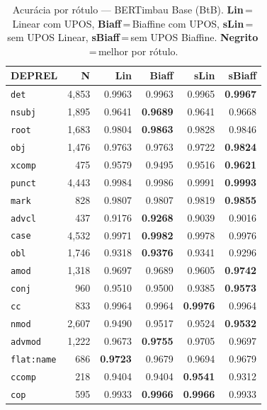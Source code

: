 \begin{table}[ht]
\centering\scriptsize
\setlength{\tabcolsep}{3pt}
\caption{Acurácia por rótulo --- BERTimbau Base (BtB). \textbf{Lin}\,=\,Linear com UPOS, \textbf{Biaff}\,=\,Biaffine com UPOS, \textbf{sLin}\,=\,sem UPOS Linear, \textbf{sBiaff}\,=\,sem UPOS Biaffine. \textbf{Negrito}\,=\,melhor por rótulo.}
\label{tab:acc-btb}
\begin{minipage}[t]{0.60\linewidth}
\centering
\begin{tabular}{l r  r r r r}
\toprule
\textbf{DEPREL} & \textbf{N} & \textbf{Lin} & \textbf{Biaff} & \textbf{sLin} & \textbf{sBiaff} \\
\midrule
\texttt{det} & 4,853 & 0.9963 & 0.9963 & 0.9965 & \textbf{0.9967} \\
\texttt{nsubj} & 1,895 & 0.9641 & \textbf{0.9689} & 0.9641 & 0.9668 \\
\texttt{root} & 1,683 & 0.9804 & \textbf{0.9863} & 0.9828 & 0.9846 \\
\texttt{obj} & 1,476 & 0.9763 & 0.9763 & 0.9722 & \textbf{0.9824} \\
\texttt{xcomp} & 475 & 0.9579 & 0.9495 & 0.9516 & \textbf{0.9621} \\
\texttt{punct} & 4,443 & 0.9984 & 0.9986 & 0.9991 & \textbf{0.9993} \\
\texttt{mark} & 828 & 0.9807 & 0.9807 & 0.9819 & \textbf{0.9855} \\
\texttt{advcl} & 437 & 0.9176 & \textbf{0.9268} & 0.9039 & 0.9016 \\
\texttt{case} & 4,532 & 0.9971 & \textbf{0.9982} & 0.9978 & 0.9976 \\
\texttt{obl} & 1,746 & 0.9318 & \textbf{0.9376} & 0.9341 & 0.9296 \\
\texttt{amod} & 1,318 & 0.9697 & 0.9689 & 0.9605 & \textbf{0.9742} \\
\texttt{conj} & 960 & 0.9510 & 0.9500 & 0.9385 & \textbf{0.9573} \\
\texttt{cc} & 833 & 0.9964 & 0.9964 & \textbf{0.9976} & 0.9964 \\
\texttt{nmod} & 2,607 & 0.9490 & 0.9517 & 0.9524 & \textbf{0.9532} \\
\texttt{advmod} & 1,222 & 0.9673 & \textbf{0.9755} & 0.9705 & 0.9697 \\
\texttt{flat\!:\!name} & 686 & \textbf{0.9723} & 0.9679 & 0.9694 & 0.9679 \\
\texttt{ccomp} & 218 & 0.9404 & 0.9404 & \textbf{0.9541} & 0.9312 \\
\texttt{cop} & 595 & 0.9933 & \textbf{0.9966} & \textbf{0.9966} & 0.9933 \\

\end{tabular}
\end{minipage}
\end{table}
